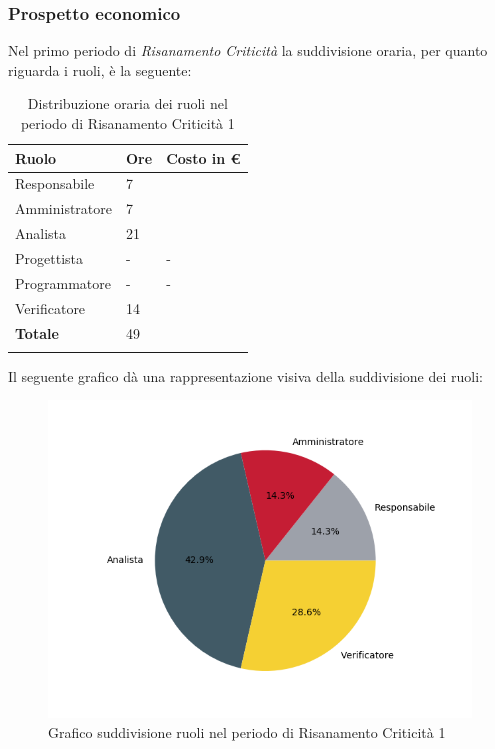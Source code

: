 \subsubsection{Prospetto economico}
Nel primo periodo di \textit{Risanamento Criticità} la suddivisione oraria, per quanto riguarda i ruoli, è la seguente: 


\begin{longtable}{| C{.30\textwidth}| C{.15\textwidth}| C{.20\textwidth}|}
\hline
\textbf{Ruolo} & \textbf{Ore} & \textbf{Costo in \euro} \\
\hline 
Responsabile & 7 &  \\
\hline
Amministratore & 7 &  \\
\hline
Analista & 21 &  \\
\hline
Progettista & - & - \\
\hline
Programmatore & - & - \\
\hline
Verificatore & 14 & \\
\hline
\textbf{Totale} & 49 &  \\
\hline


\caption{Distribuzione oraria dei ruoli nel periodo di Risanamento Criticità 1}
\label{Distribuzione oraria del periodo di rc1}
\end{longtable}

Il seguente grafico dà una rappresentazione visiva della suddivisione dei ruoli:
\begin{figure}[H]
	\centering
  		\includegraphics[width=1\linewidth]{./images/torta_rc1.png}
  		\caption{Grafico suddivisione ruoli nel periodo di Risanamento Criticità 1}
  		\label{fig:grafico suddivione ruoli periodo di rc1}
\end{figure}


